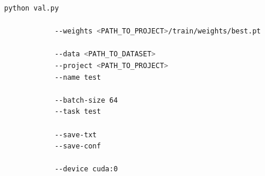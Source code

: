 \begin{minipage}{\linewidth}
	\begin{lstlisting}[language=Bash, keywordstyle=\color{black}, 
		caption=General command to run the testing task of YOLOv5., label=lst:aa:testcmd]
		python val.py
			
			--weights <PATH_TO_PROJECT>/train/weights/best.pt
			
			--data <PATH_TO_DATASET>
			--project <PATH_TO_PROJECT>
			--name test
			
			--batch-size 64
			--task test
			
			--save-txt
			--save-conf
			
			--device cuda:0
	\end{lstlisting}
\end{minipage}
